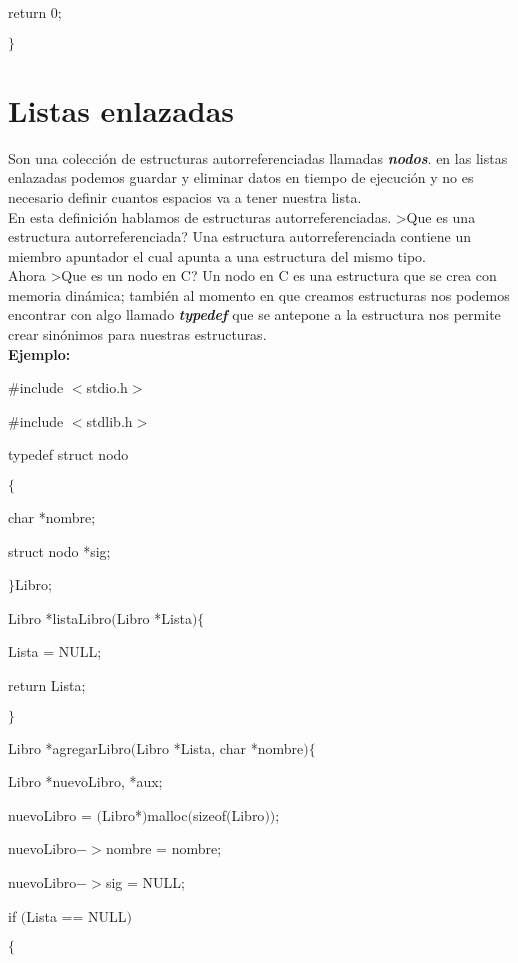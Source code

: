 \documentclass[]{article}
\begin{document}
	return 0;
	
	$\rbrace$
	
	\section{Listas enlazadas}
	
	Son una colección de estructuras autorreferenciadas llamadas \textit{\textbf{nodos}}. en las listas enlazadas podemos guardar y eliminar datos en tiempo de ejecución y no es necesario definir cuantos espacios va a tener nuestra lista.\\
	
	En esta definición hablamos de estructuras autorreferenciadas. >Que es una estructura autorreferenciada? Una estructura autorreferenciada contiene un miembro apuntador el cual apunta a una estructura del mismo tipo.\\
	
	Ahora >Que es un nodo en C? Un nodo en C es una estructura que se crea con memoria dinámica; también al momento en que creamos estructuras nos podemos encontrar con algo llamado \textit{\textbf{typedef}} que se antepone a la estructura nos permite crear sinónimos para nuestras estructuras.\\
	
	\textbf{Ejemplo:}
	
	\#include $<$stdio.h$>$
	
	\#include $<$stdlib.h$>$
	
	typedef struct nodo
	
	$\lbrace$
	
	char *nombre;
	
	struct nodo *sig;
	
	$\rbrace$Libro;
	
	Libro *listaLibro$($Libro *Lista$)$$\lbrace$
	
	Lista = NULL;
	
	return Lista;
	
	$\rbrace$
	
	Libro *agregarLibro$($Libro *Lista, char *nombre$)$$\lbrace$
	
	Libro *nuevoLibro, *aux;
	
	nuevoLibro = $($Libro*$)$malloc$($sizeof$($Libro$))$;
	
	nuevoLibro$->$nombre = nombre;
	
	nuevoLibro$->$sig = NULL;
	
	if $($Lista == NULL$)$
	
	$\lbrace$
	
\end{document}
